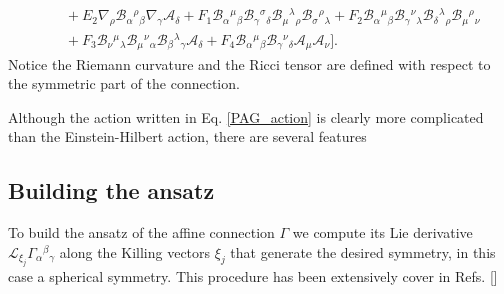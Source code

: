 \documentclass{article}
\providecommand{\ctG}[3]{\Gamma_{#1}{}^{ #2}{}_{#3}}
\begin{document}
\begin{equation}
\begin{split}
    \\
    &\quad
    + E_2 \nabla_\rho \mathcal{B}_{\alpha}{}^{\rho}{}_{\beta} \nabla_\gamma \mathcal{A}_\delta
    + F_1 \mathcal{B}_{\alpha}{}^{\mu}{}_{\beta} \mathcal{B}_{\gamma}{}^{\sigma}{}_{\delta} \mathcal{B}_{\mu}{}^{\lambda}{}_{\rho} \mathcal{B}_{\sigma}{}^{\rho}{}_{\lambda}
    + F_2\mathcal{B}_{\alpha}{}^{\mu}{}_{\beta} \mathcal{B}_{\gamma}{}^{\nu}{}_{\lambda} \mathcal{B}_{\delta}{}^{\lambda}{}_{\rho} \mathcal{B}_{\mu}{}^{\rho}{}_{\nu}
    \\
    &\quad
    + F_3 \mathcal{B}_{\nu}{}^{\mu}{}_{\lambda} \mathcal{B}_{\mu}{}^{\nu}{}_{\alpha} \mathcal{B}_{\beta}{}^{\lambda}{}_{\gamma} \mathcal{A}_\delta
    + F_4 \mathcal{B}_{\alpha}{}^{\mu}{}_{\beta}\mathcal{B}_{\gamma}{}^{\nu}{}_{\delta}\mathcal{A}_\mu \mathcal{A}_\nu \bigg].
    \end{split}
\end{equation}
Notice the Riemann curvature and the Ricci tensor are defined with respect to the symmetric part
of the connection.

Although the action written in Eq. \eqref{PAG_action} is clearly more complicated than
the Einstein-Hilbert action, there are several features

\subsection{Building the ansatz}

To build the ansatz of the affine connection $\Gamma$ we compute its Lie derivative 
$\mathcal{L}_{\xi_j}\ctG{\alpha}{\beta}{\gamma}$ along the Killing vectors $\xi_j$ that 
generate the desired symmetry, in this case a spherical symmetry. This procedure
has been extensively cover in Refs. [] 
\end{document}
